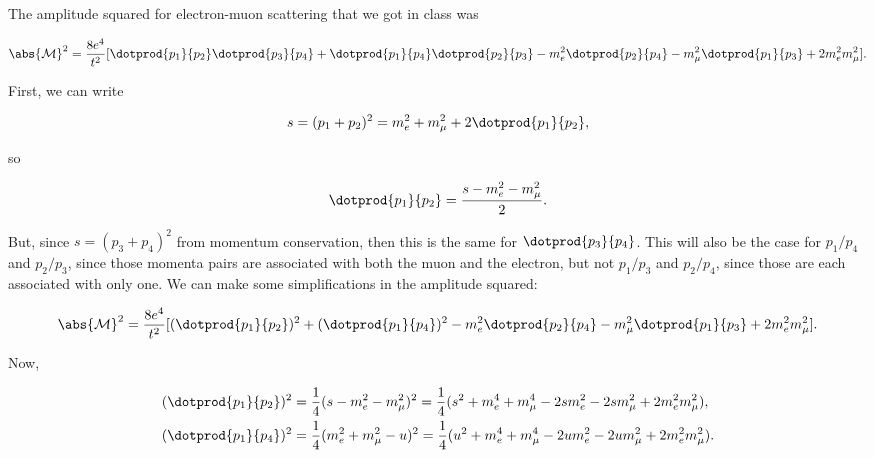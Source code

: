 \section{}

The amplitude squared for electron-muon scattering that we got in class was

\begin{equation}
    \abs{\mathcal{M}}^2 = \frac{8e^4}{t^2}[\dotprod{p_1}{p_2}\dotprod{p_3}{p_4} + \dotprod{p_1}{p_4}\dotprod{p_2}{p_3} - m_e^2\dotprod{p_2}{p_4} - m_{\mu}^2\dotprod{p_1}{p_3} + 2m_e^2m_{\mu}^2].
\end{equation}

First, we can write

\begin{equation*}
    s = (p_1 + p_2)^2 = m_e^2 + m_{\mu}^2 + 2\dotprod{p_1}{p_2},
\end{equation*}

so

\begin{equation*}
    \dotprod{p_1}{p_2} = \frac{s - m_e^2 - m_{\mu}^2}{2}.
\end{equation*}

But, since $s = (p_3 + p_4)^2$ from momentum conservation, then this is the same for $\dotprod{p_3}{p_4}$. This will also be the case for $p_1/p_4$ and $p_2/p_3$, since those momenta pairs are associated with both the muon and the electron, but not $p_1/p_3$ and $p_2/p_4$, since those are each associated with only one. We can make some simplifications in the amplitude squared:

\begin{equation*}
    \abs{\mathcal{M}}^2 = \frac{8e^4}{t^2}[(\dotprod{p_1}{p_2})^2 + (\dotprod{p_1}{p_4})^2 - m_e^2\dotprod{p_2}{p_4} - m_{\mu}^2\dotprod{p_1}{p_3} + 2m_e^2m_{\mu}^2].
\end{equation*}

Now,

\begin{align*}
    (\dotprod{p_1}{p_2})^2 &= \frac{1}{4}(s - m_e^2 - m_{\mu}^2)^2 = \frac{1}{4}(s^2 + m_e^4 + m_{\mu}^4 - 2sm_e^2 - 2sm_{\mu}^2 + 2m_e^2m_{\mu}^2), \\
    (\dotprod{p_1}{p_4})^2 &= \frac{1}{4}(m_e^2 + m_{\mu}^2 - u)^2 = \frac{1}{4}(u^2 + m_e^4 + m_{\mu}^4 - 2um_e^2 - 2um_{\mu}^2 + 2m_e^2m_{\mu}^2).
\end{align*}

